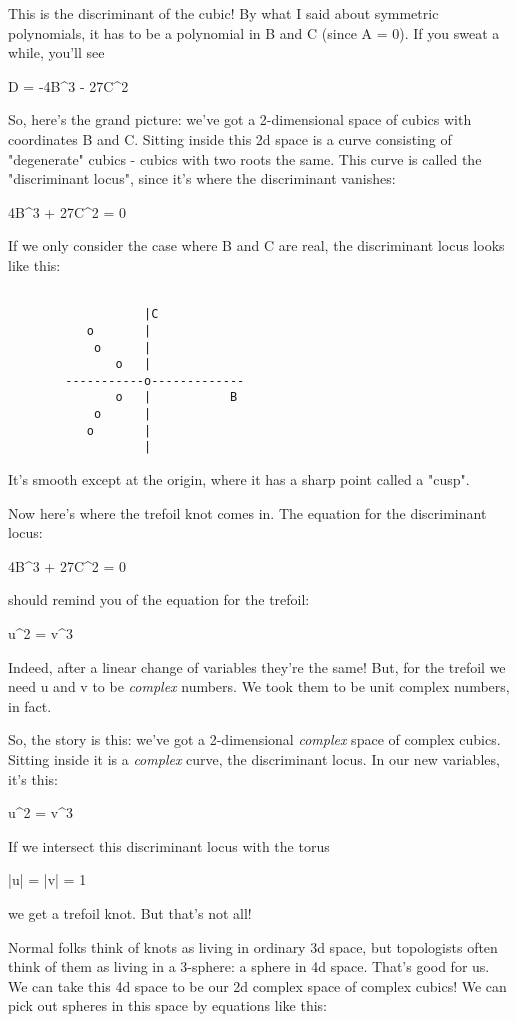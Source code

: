 This is the discriminant of the cubic!  By what I said about symmetric 
polynomials, it has to be a polynomial in B and C (since A = 0).  If 
you sweat a while, you'll see 

D = -4B^{3} - 27C^{2}

So, here's the grand picture: we've got a 2-dimensional space of 
cubics with coordinates B and C.   Sitting inside this 2d space is a 
curve consisting of "degenerate" cubics - cubics with two roots the 
same.  This curve is called the "discriminant locus", since it's where 
the discriminant vanishes:

4B^{3} + 27C^{2} = 0

If we only consider the case where B and C are real, the discriminant 
locus looks like this:


\begin{verbatim}

                   |C
           o       |      
            o      |     
               o   |  
        -----------o-------------
               o   |           B
            o      |     
           o       |
                   |
\end{verbatim}
    
It's smooth except at the origin, where it has a sharp point called
a "cusp".

Now here's where the trefoil knot comes in.  The equation for the 
discriminant locus:

4B^{3} + 27C^{2} = 0

should remind you of the equation for the trefoil:

u^{2} = v^{3} 

Indeed, after a linear change of variables they're the same!   
But, for the trefoil we need u and v to be \emph{complex} numbers.  
We took them to be unit complex numbers, in fact.

So, the story is this: we've got a 2-dimensional \emph{complex} space 
of complex cubics.  Sitting inside it is a \emph{complex} curve, the
discriminant locus.  In our new variables, it's this:

u^{2} = v^{3}

If we intersect this discriminant locus with the torus 

|u| = |v| = 1

we get a trefoil knot.  But that's not all!

Normal folks think of knots as living in ordinary 3d space, but 
topologists often think of them as living in a 3-sphere: a sphere 
in 4d space.  That's good for us.  We can take this 4d space to be
our 2d complex space of complex cubics!  We can pick out spheres in 
this space by equations like this:

